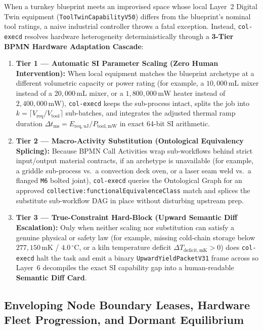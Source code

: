 When a turnkey blueprint meets an improvised space whose local Layer~2 Digital Twin equipment (\texttt{ToolTwinCapabilityV50}) differs from the blueprint's nominal tool ratings, a naive industrial controller throws a fatal exception. Instead, \texttt{col-execd} resolves hardware heterogeneity deterministically through a \textbf{3-Tier BPMN Hardware Adaptation Cascade}:
\begin{enumerate}
  \item \textbf{Tier 1 --- Automatic SI Parameter Scaling (Zero Human Intervention):} When local equipment matches the blueprint archetype at a different volumetric capacity or power rating (for example, a $10{,}000\,\mathrm{mL}$ mixer instead of a $20{,}000\,\mathrm{mL}$ mixer, or a $1{,}800{,}000\,\mathrm{mW}$ heater instead of $2{,}400{,}000\,\mathrm{mW}$), \texttt{col-execd} keeps the sub-process intact, splits the job into $k = \lceil V_{\mathrm{req}} / V_{\mathrm{tool}} \rceil$ sub-batches, and integrates the adjusted thermal ramp duration $\Delta t_{\mathrm{ms}} = E_{\mathrm{req,uJ}} / P_{\mathrm{tool,mW}}$ in exact 64-bit SI arithmetic.
  \item \textbf{Tier 2 --- Macro-Activity Substitution (Ontological Equivalency Splicing):} Because BPMN Call Activities wrap sub-workflows behind strict input/output material contracts, if an archetype is unavailable (for example, a griddle sub-process vs.\ a convection deck oven, or a laser seam weld vs.\ a flanged \texttt{M6} bolted joint), \texttt{col-execd} queries the Ontological Graph for an approved \texttt{collective:functionalEquivalenceClass} match and splices the substitute sub-workflow DAG in place without disturbing upstream prep.
  \item \textbf{Tier 3 --- True-Constraint Hard-Block (Upward Semantic Diff Escalation):} Only when neither scaling nor substitution can satisfy a genuine physical or safety law (for example, missing cold-chain storage below $277{,}150\,\mathrm{mK}$ / $4.0\,^\circ\mathrm{C}$, or a kiln temperature deficit $\Delta T_{\mathrm{deficit,mK}} > 0$) does \texttt{col-execd} halt the task and emit a binary \texttt{UpwardYieldPacketV31} frame across  so Layer~6 decompiles the exact SI capability gap into a human-readable \textbf{Semantic Diff Card}.
\end{enumerate}

\subsection{Enveloping Node Boundary Leases, Hardware Fleet Progression, and Dormant Equilibrium}

